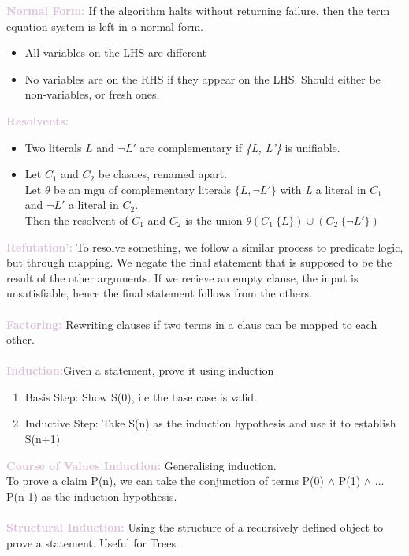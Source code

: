 \documentclass[a4paper,10pt]{article}
\begin{document}
\newpage
\noindent \textcolor{Thistle}{\textbf{Normal Form:}} If the algorithm halts without returning failure, then the term equation system is left in a normal form. 
\renewcommand{\labelitemi}{\textperiodcentered}
	\begin{itemize}
	\item All variables on the LHS are different 
	\item No variables are on the RHS if they appear on the LHS. Should either be non-variables, or fresh ones.  
	\end{itemize}
\noindent \textcolor{Thistle}{\textbf{Resolvents:}}
\renewcommand{\labelitemi}{\textperiodcentered}
	\begin{itemize}
	\item Two literals $L$ and $\neg L'$ are complementary if \emph{\{L, L'\}} is unifiable.
	\item Let $C_{1}$ and $C_{2}$ be clasues, renamed apart. \\
	Let $\theta$ be an mgu of complementary literals $\{L, \neg L'\}$ with \emph{L} a literal in $C_{1}$ and $\neg L'$ a literal in $C_{2}$. \\
	Then the resolvent of $C_{1}$ and $C_{2}$ is the union $\theta(C_{1} \ \{L\}) \cup (C_{2} \ \{\neg L'\})$
	\end{itemize}
\noindent \textcolor{Thistle}{\textbf{Refutation':}} To resolve something, we follow a similar process to predicate logic, but through mapping. We negate the final statement that is supposed to be the result of the other arguments. If we recieve an empty clause, the input is unsatisfiable, hence the final statement follows from the others. \\ \\
\noindent \textcolor{Thistle}{\textbf{Factoring:}} Rewriting clauses if two terms in a claus can be mapped to each other. \\ \\
\noindent \textcolor{Thistle}{\textbf{Induction:}}Given a statement, prove it using induction
\begin{enumerate}
\item Basis Step: Show S(0), i.e the base case is valid.
\item Inductive Step: Take S(n) as the induction hypothesis and use it to establish S(n+1)
\end{enumerate}
\noindent \textcolor{Thistle}{\textbf{Course of Values Induction:}} Generalising induction. \\ 
To prove a claim P(n), we can take the conjunction of terms P(0) $\land$ P(1) $\land$ ... P(n-1) as the induction hypothesis. \\\\
\noindent \textcolor{Thistle}{\textbf{Structural Induction:}} Using the structure of a recursively defined object to prove a statement. Useful for Trees. \\ \\
\end{document}
